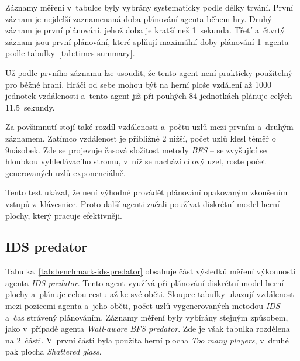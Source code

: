 Záznamy měření v~tabulce byly vybrány systematicky podle délky trvání. První záznam je nejdelší zaznamenaná doba plánování agenta během hry. Druhý záznam je první plánování, jehož doba je kratší než 1~sekunda. Třetí a~čtvrtý záznam jsou první plánování, které splňují maximální doby plánování 1~agenta podle tabulky~\ref{tab:times-summary}.

Už podle prvního záznamu lze usoudit, že tento agent není prakticky použitelný pro běžné hraní. Hráči od sebe mohou být na herní ploše vzdálení až 1000 jednotek vzdálenosti a~tento agent již při pouhých 84 jednotkách plánuje celých 11,5~sekundy.

Za povšimnutí stojí také rozdíl vzdálenosti a~počtu uzlů mezi prvním a~druhým záznamem. Zatímco vzdálenost je přibližně 2\texttimes{} nižší, počet uzlů klesl téměř o 9násobek. Zde se projevuje časová složitost metody \emph{BFS} -- se zvyšující se hloubkou vyhledávacího stromu, v~níž se nachází cílový uzel, roste počet generovaných uzlů exponenciálně.

Tento test ukázal, že není výhodné provádět plánování opakovaným zkoušením vstupů z~klávesnice. Proto další agenti začali používat diskrétní model herní plochy, který pracuje efektivněji.

\subsection*{IDS predator}

Tabulka~\ref{tab:benchmark-ids-predator} obsahuje část výsledků měření výkonnosti agenta \emph{IDS predator}. Tento agent využívá při plánování diskrétní model herní plochy a~plánuje celou cestu až ke své oběti. Sloupce tabulky ukazují vzdálenost mezi pozicemi agenta a~jeho oběti, počet uzlů vygenerovaných metodou \emph{IDS} a~čas strávený plánováním. Záznamy měření byly vybírány stejným způsobem, jako v~případě agenta \emph{Wall-aware BFS predator}. Zde je však tabulka rozdělena na 2~části. V~první části byla použita herní plocha  \emph{Too many players}, v~druhé pak plocha \emph{Shattered glass}.

